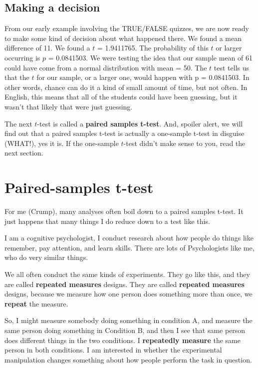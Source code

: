 \documentclass[
  letterpaper,
  DIV=11,
  numbers=noendperiod]{scrreprt}
\begin{document}
\subsection{Making a decision}\label{making-a-decision}

From our early example involving the TRUE/FALSE quizzes, we are now
ready to make some kind of decision about what happened there. We found
a mean difference of 11. We found a \(t\) = 1.9411765. The probability
of this \(t\) or larger occurring is \(p\) = 0.0841503. We were testing
the idea that our sample mean of 61 could have come from a normal
distribution with mean = 50. The \(t\) test tells us that the \(t\) for
our sample, or a larger one, would happen with p = 0.0841503. In other
words, chance can do it a kind of small amount of time, but not often.
In English, this means that all of the students could have been
guessing, but it wasn't that likely that were just guessing.

The next \(t\)-test is called a \textbf{paired samples t-test}. And,
spoiler alert, we will find out that a paired samples t-test is actually
a one-sample t-test in disguise (WHAT!), yes it is. If the one-sample
\(t\)-test didn't make sense to you, read the next section.

\section{Paired-samples t-test}\label{paired-samples-t-test}

For me (Crump), many analyses often boil down to a paired samples
t-test. It just happens that many things I do reduce down to a test like
this.

I am a cognitive psychologist, I conduct research about how people do
things like remember, pay attention, and learn skills. There are lots of
Psychologists like me, who do very similar things.

We all often conduct the same kinds of experiments. They go like this,
and they are called \textbf{repeated measures} designs. They are called
\textbf{repeated measures} designs, because we measure how one person
does something more than once, we \textbf{repeat} the measure.

So, I might measure somebody doing something in condition A, and measure
the same person doing something in Condition B, and then I see that same
person does different things in the two conditions. I \textbf{repeatedly
measure} the same person in both conditions. I am interested in whether
the experimental manipulation changes something about how people perform
the task in question.
\end{document}
